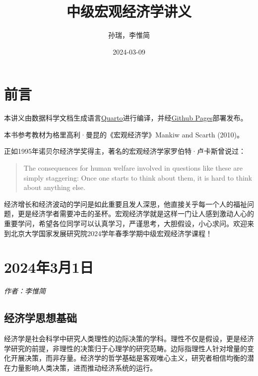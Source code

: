 \documentclass[
  11pt,
  letterpaper,
]{ctexbook}
\title{中级宏观经济学讲义}
\author{孙瑞，李惟简}
\date{2024-03-09}
\renewcommand*\contentsname{Table of contents}
\newcommand\contentsname{Table of contents}
\begin{document}
\frontmatter
\maketitle

\renewcommand*\contentsname{Table of contents}
{
\hypersetup{linkcolor=}
\setcounter{tocdepth}{2}
\tableofcontents
}
\mainmatter
{}

\chapter*{前言}\label{ux524dux8a00}


本讲义由数据科学文档生成语言\href{https://quarto.org/docs/books}{Quarto}进行编译，并经\href{https://pages.github.com/}{Github
Pages}部署发布。

本书参考教材为格里高利·曼昆的《宏观经济学》Mankiw and Scarth (2010)。

正如1995年诺贝尔经济学奖得主，著名的宏观经济学家罗伯特·卢卡斯曾说过：

\begin{quote}
The consequences for human welfare involved in questions like these are
simply staggering: Once one starts to think about them, it is hard to
think about anything else.
\end{quote}

经济增长和经济波动的学问是如此重要且发人深思，他直接关乎每一个人的福祉问题，更是经济学者需要冲击的圣杯。宏观经济学就是这样一门让人感到激动人心的重要学问，希望各位同学可以认真学习，严谨思考，大胆假设，小心求问。欢迎来到北京大学国家发展研究院2024学年春季学期中级宏观经济学课程！


\chapter{2024年3月1日}\label{ux5e743ux67081ux65e5}

\emph{作者：李惟简}

\section{经济学思想基础}\label{ux7ecfux6d4eux5b66ux601dux60f3ux57faux7840}

经济学是社会科学中研究人类理性的边际决策的学科。理性不仅是假设，更是经济学研究的前提，非理性的决策归于心理学的研究范畴。边际指理性人针对增量的变化开展决策，而非存量。经济学的哲学基础是客观唯心主义，研究者相信均衡的潜在力量影响人类决策，进而推动经济系统的运行。
\end{document}
